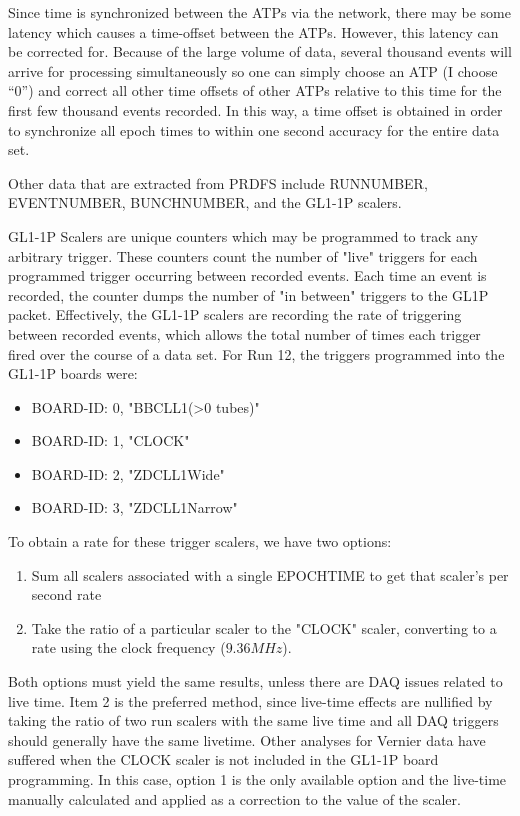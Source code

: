 Since time is synchronized between the ATPs via the network, there may be some
latency which causes a time-offset between the ATPs. However, this latency can
be corrected for.  Because of the large volume of data, several thousand events
will arrive for processing simultaneously so one can simply choose an ATP (I
choose ``0'') and correct all other time offsets of other ATPs relative to this
time for the first few thousand events recorded. In this way, a time offset is
obtained in order to synchronize all epoch times to within one second accuracy
for the entire data set.

Other data that are extracted from PRDFS include RUNNUMBER,  EVENTNUMBER,
BUNCHNUMBER, and the GL1-1P scalers.

GL1-1P Scalers are unique counters which may be programmed to track any
arbitrary trigger. These counters count the number of "live" triggers for each
programmed trigger occurring between recorded events. Each time an event is
recorded, the counter dumps the number of "in between" triggers to the GL1P
packet. Effectively, the GL1-1P scalers are recording the rate of triggering
between recorded events, which allows the total number of times each trigger
fired over the course of a data set. For Run 12, the triggers programmed into
the GL1-1P boards were:

\begin{itemize}
\item BOARD-ID: 0, "BBCLL1(\textgreater0 tubes)"
\item BOARD-ID: 1, "CLOCK"
\item BOARD-ID: 2, "ZDCLL1Wide"
\item BOARD-ID: 3, "ZDCLL1Narrow"
\end{itemize}

To obtain a rate for these trigger scalers, we have two options:
\begin{enumerate}
\item Sum all scalers associated with a single EPOCHTIME to get that scaler's
  per second rate
\item Take the ratio of a particular scaler to the "CLOCK" scaler, converting
  to a rate using the clock frequency ($9.36MHz$).
\end{enumerate}

Both options must yield the same results, unless there are DAQ issues related
to live time. Item 2 is the preferred method, since live-time effects are
nullified by taking the ratio of two run scalers with the same live time and
all DAQ triggers should generally have the same livetime. Other analyses for
Vernier data have suffered when the CLOCK scaler is not included in the GL1-1P
board programming. In this case, option 1 is the only available option and the
live-time manually calculated and applied as a correction to the value of the
scaler.

